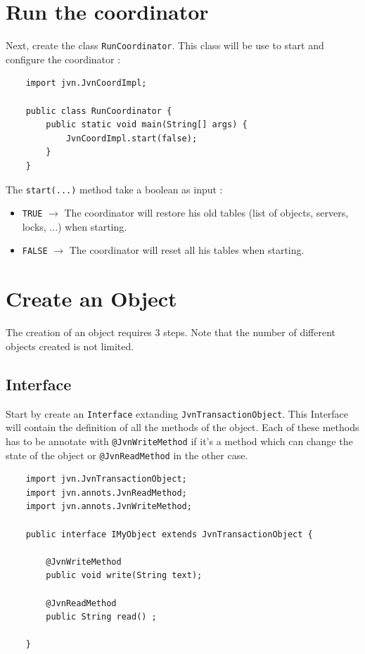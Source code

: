 \documentclass{article}
\begin{document}
\section{Run the coordinator}

Next, create the class \texttt{RunCoordinator}. This class will be use to start and configure the coordinator : \\

\noindent
\begin{verbatim}
    import jvn.JvnCoordImpl;

    public class RunCoordinator {
        public static void main(String[] args) {
            JvnCoordImpl.start(false);
        }
    }
\end{verbatim}
\vspace{0.3cm}

\noindent The \texttt{start(...)} method take a boolean as input :

\begin{itemize}
\item \texttt{TRUE} $\rightarrow$ The coordinator will restore his old tables (list of objects, servers, locks, ...) when starting.
\item \texttt{FALSE} $\rightarrow$ The coordinator will reset all his tables when starting.
\end{itemize}

\section{Create an Object}

The creation of an object requires 3 steps. Note that the number of different objects created is not limited.

\subsection{Interface}

Start by create an \texttt{Interface} extanding \texttt{JvnTransactionObject}. This Interface will contain the definition of all the methods of the object. Each of these methods has to be annotate with \texttt{@JvnWriteMethod} if it's a method which can change the state of the object or \texttt{@JvnReadMethod} in the other case. \\

\noindent
\begin{verbatim}
    import jvn.JvnTransactionObject;
    import jvn.annots.JvnReadMethod;
    import jvn.annots.JvnWriteMethod;

    public interface IMyObject extends JvnTransactionObject {
	
        @JvnWriteMethod
        public void write(String text);
	
        @JvnReadMethod
        public String read() ;
	
    }
\end{verbatim}
\end{document}
